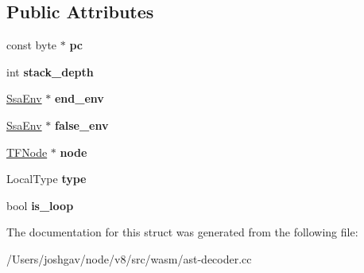 \subsection*{Public Attributes}
\begin{DoxyCompactItemize}
\item 
const byte $\ast$ {\bfseries pc}\hypertarget{structv8_1_1internal_1_1wasm_1_1_control_a797985a9450e63ea46e48d8008610d73}{}\label{structv8_1_1internal_1_1wasm_1_1_control_a797985a9450e63ea46e48d8008610d73}

\item 
int {\bfseries stack\+\_\+depth}\hypertarget{structv8_1_1internal_1_1wasm_1_1_control_af490469ea77d66ab257ecc2b8d67e953}{}\label{structv8_1_1internal_1_1wasm_1_1_control_af490469ea77d66ab257ecc2b8d67e953}

\item 
\hyperlink{structv8_1_1internal_1_1wasm_1_1_ssa_env}{Ssa\+Env} $\ast$ {\bfseries end\+\_\+env}\hypertarget{structv8_1_1internal_1_1wasm_1_1_control_a8a311dd291556ab0c12a0677d27eb861}{}\label{structv8_1_1internal_1_1wasm_1_1_control_a8a311dd291556ab0c12a0677d27eb861}

\item 
\hyperlink{structv8_1_1internal_1_1wasm_1_1_ssa_env}{Ssa\+Env} $\ast$ {\bfseries false\+\_\+env}\hypertarget{structv8_1_1internal_1_1wasm_1_1_control_ae38f198e4763d21277fea6ebc59d8aee}{}\label{structv8_1_1internal_1_1wasm_1_1_control_ae38f198e4763d21277fea6ebc59d8aee}

\item 
\hyperlink{classv8_1_1internal_1_1compiler_1_1_node}{T\+F\+Node} $\ast$ {\bfseries node}\hypertarget{structv8_1_1internal_1_1wasm_1_1_control_ab6eed818b8af99197e5fddddd6189893}{}\label{structv8_1_1internal_1_1wasm_1_1_control_ab6eed818b8af99197e5fddddd6189893}

\item 
Local\+Type {\bfseries type}\hypertarget{structv8_1_1internal_1_1wasm_1_1_control_ab049d234a1d121e6cc3afac68307d91a}{}\label{structv8_1_1internal_1_1wasm_1_1_control_ab049d234a1d121e6cc3afac68307d91a}

\item 
bool {\bfseries is\+\_\+loop}\hypertarget{structv8_1_1internal_1_1wasm_1_1_control_ac95435075316211ec7448387801645be}{}\label{structv8_1_1internal_1_1wasm_1_1_control_ac95435075316211ec7448387801645be}

\end{DoxyCompactItemize}


The documentation for this struct was generated from the following file\+:\begin{DoxyCompactItemize}
\item 
/\+Users/joshgav/node/v8/src/wasm/ast-\/decoder.\+cc\end{DoxyCompactItemize}
